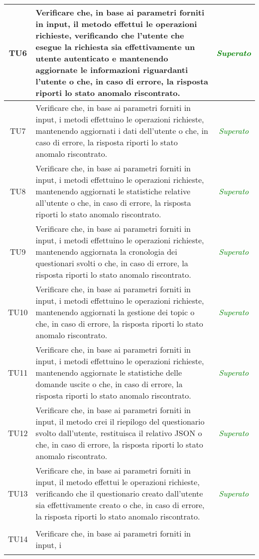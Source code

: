 \begin{longtable}{|c|>{}m{10cm}|c|}
\hypertarget{TU6}{TU6} & Verificare che, in base ai parametri forniti in input,
il metodo effettui le operazioni richieste, verificando
che l’utente che esegue la richiesta sia effettivamente
un utente autenticato e mantenendo aggiornate le
informazioni riguardanti l’utente
o che, in caso di errore, la risposta riporti lo stato
anomalo riscontrato. & \textcolor{Green}{\textit{Superato}}\\ \hline
\hypertarget{TU7}{TU7} & Verificare che, in base ai parametri forniti in input, i
metodi effettuino le operazioni richieste, mantenendo
aggiornati i dati dell'utente o che, in caso di
errore, la risposta riporti lo stato anomalo riscontrato. & \textcolor{Green}{\textit{Superato}}\\ \hline
\hypertarget{TU8}{TU8} & Verificare che, in base ai parametri forniti in input, i
metodi effettuino le operazioni richieste, mantenendo
aggiornati le statistiche relative all'utente o che, in caso di
errore, la risposta riporti lo stato anomalo riscontrato. & \textcolor{Green}{\textit{Superato}}\\ \hline
\hypertarget{TU9}{TU9} & Verificare che, in base ai parametri forniti in input, i
metodi effettuino le operazioni richieste, mantenendo
aggiornata la cronologia dei questionari svolti o che, in caso di
errore, la risposta riporti lo stato anomalo riscontrato. & \textcolor{Green}{\textit{Superato}}\\ \hline
\hypertarget{TU10}{TU10} & Verificare che, in base ai parametri forniti in input, i metodi effettuino le operazioni richieste, mantenendo aggiornati la gestione dei topic o che, in caso di errore, la risposta riporti lo stato anomalo riscontrato. & \textcolor{Green}{\textit{Superato}}\\ \hline
\hypertarget{TU11}{TU11} & Verificare che, in base ai parametri forniti in input, i metodi effettuino le operazioni richieste, mantenendo aggiornate le statistiche delle domande uscite o che, in caso di errore, la risposta riporti lo stato anomalo riscontrato. & \textcolor{Green}{\textit{Superato}}\\ \hline
\hypertarget{TU12}{TU12} & Verificare che, in base ai parametri forniti in input,
il metodo crei il riepilogo del questionario svolto dall'utente, restituisca il relativo JSON o che, in caso di
errore, la risposta riporti lo stato anomalo riscontrato. & \textcolor{Green}{\textit{Superato}}\\ \hline
\hypertarget{TU13}{TU13} & Verificare che, in base ai parametri forniti in input,
il metodo effettui le operazioni richieste, verificando
che il questionario creato dall'utente sia effettivamente creato 
o che, in caso di errore, la risposta riporti lo stato
anomalo riscontrato. & \textcolor{Green}{\textit{Superato}}\\ \hline
\hypertarget{TU14}{TU14} & Verificare che, in base ai parametri forniti in input, i


\end{longtable}
